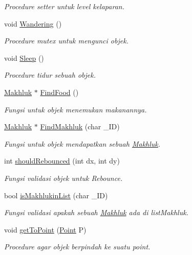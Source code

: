\begin{DoxyCompactItemize}
\begin{DoxyCompactList}\small\item\em Procedure setter untuk level kelaparan. \end{DoxyCompactList}\item 
void \hyperlink{class_hewan_a8268bfb533b9becb62e2bd8eee2e7960}{Wandering} ()
\begin{DoxyCompactList}\small\item\em Procedure mutex untuk mengunci objek. \end{DoxyCompactList}\item 
void \hyperlink{class_hewan_ad1ba348d0912e3e392e41ae0c197c69b}{Sleep} ()
\begin{DoxyCompactList}\small\item\em Procedure tidur sebuah objek. \end{DoxyCompactList}\item 
\hyperlink{class_makhluk}{Makhluk} $\ast$ \hyperlink{class_hewan_ab604462c6b9c235f9d53d42235acd41b}{Find\+Food} ()
\begin{DoxyCompactList}\small\item\em Fungsi untuk objek menemukan makanannya. \end{DoxyCompactList}\item 
\hyperlink{class_makhluk}{Makhluk} $\ast$ \hyperlink{class_hewan_a7d89c8d0bee799698b986159c67f6bb3}{Find\+Makhluk} (char \+\_\+\+ID)
\begin{DoxyCompactList}\small\item\em Fungsi untuk objek mendapatkan sebuah \hyperlink{class_makhluk}{Makhluk}. \end{DoxyCompactList}\item 
int \hyperlink{class_hewan_af4ae28e9179a2438a666b26e1882139d}{should\+Rebounced} (int dx, int dy)
\begin{DoxyCompactList}\small\item\em Fungsi validasi objek untuk Rebounce. \end{DoxyCompactList}\item 
bool \hyperlink{class_hewan_a3798162fd7aa8cfef947abce00c283ef}{is\+Makhlukin\+List} (char \+\_\+\+ID)
\begin{DoxyCompactList}\small\item\em Fungsi validasi apakah sebuah \hyperlink{class_makhluk}{Makhluk} ada di list\+Makhluk. \end{DoxyCompactList}\item 
void \hyperlink{class_hewan_a5420deb2ff65c6cedd5c80f1f3d42d00}{get\+To\+Point} (\hyperlink{class_point}{Point} P)
\begin{DoxyCompactList}\small\item\em Procedure agar objek berpindah ke suatu point. \end{DoxyCompactList}\end{DoxyCompactItemize}

